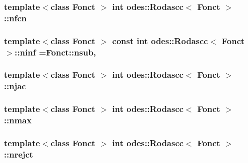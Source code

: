 \hypertarget{classodes_1_1Rodascc_a865d72e57126133f90bcd81c6b045172}{
\subsubsection[{nfcn}]{\setlength{\rightskip}{0pt plus 5cm}template$<$class Fonct $>$ int {\bf odes\-::\-Rodascc}$<$ Fonct $>$\-::nfcn\hspace{0.3cm}{\ttfamily [private]}}}\label{classodes_1_1Rodascc_a865d72e57126133f90bcd81c6b045172}
\hypertarget{classodes_1_1Rodascc_a72b21cd42a31626c76d828b56ba50c7f}{
\subsubsection[{ninf}]{\setlength{\rightskip}{0pt plus 5cm}template$<$class Fonct $>$ const int {\bf odes\-::\-Rodascc}$<$ Fonct $>$\-::ninf =Fonct\-::nsub\hspace{0.3cm}{\ttfamily [static]}, {\ttfamily [private]}}}\label{classodes_1_1Rodascc_a72b21cd42a31626c76d828b56ba50c7f}
\hypertarget{classodes_1_1Rodascc_aaf5ff60c85f52ed4b4431a00e2782e83}{
\subsubsection[{njac}]{\setlength{\rightskip}{0pt plus 5cm}template$<$class Fonct $>$ int {\bf odes\-::\-Rodascc}$<$ Fonct $>$\-::njac\hspace{0.3cm}{\ttfamily [private]}}}\label{classodes_1_1Rodascc_aaf5ff60c85f52ed4b4431a00e2782e83}
\hypertarget{classodes_1_1Rodascc_a3403627bcfb7adb71ba01d2a3e2e524a}{
\subsubsection[{nmax}]{\setlength{\rightskip}{0pt plus 5cm}template$<$class Fonct $>$ int {\bf odes\-::\-Rodascc}$<$ Fonct $>$\-::nmax\hspace{0.3cm}{\ttfamily [private]}}}\label{classodes_1_1Rodascc_a3403627bcfb7adb71ba01d2a3e2e524a}
\hypertarget{classodes_1_1Rodascc_a403281ba410e533ce97115ed38e7625c}{
\subsubsection[{nrejct}]{\setlength{\rightskip}{0pt plus 5cm}template$<$class Fonct $>$ int {\bf odes\-::\-Rodascc}$<$ Fonct $>$\-::nrejct\hspace{0.3cm}{\ttfamily [private]}}}\label{classodes_1_1Rodascc_a403281ba410e533ce97115ed38e7625c}
